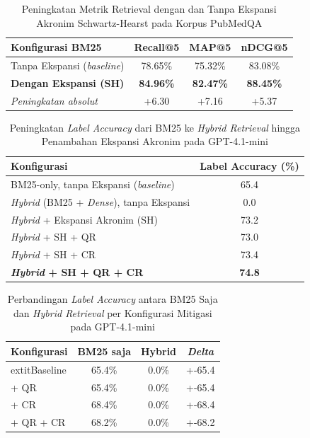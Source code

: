 \begin{table}[H]
\centering
\caption{Peningkatan Metrik Retrieval dengan dan Tanpa Ekspansi Akronim Schwartz-Hearst pada Korpus PubMedQA}
\label{tbl:retrieval-metrics}
\begin{tabular}{|l|c|c|c|}
\hline
\textbf{Konfigurasi BM25} & \textbf{Recall@5} & \textbf{MAP@5} & \textbf{nDCG@5} \\ \hline
Tanpa Ekspansi (\textit{baseline}) & 78.65\% & 75.32\% & 83.08\% \\ \hline
\textbf{Dengan Ekspansi (SH)} & \textbf{84.96\%} & \textbf{82.47\%} & \textbf{88.45\%} \\ \hline
\textit{Peningkatan absolut} & +6.30 & +7.16 & +5.37 \\ \hline
\end{tabular}
\end{table}

\begin{table}[H]
\centering
\caption{Peningkatan \textit{Label Accuracy} dari BM25 ke \textit{Hybrid Retrieval} hingga Penambahan Ekspansi Akronim pada GPT-4.1-mini}
\label{tbl:bm25-vs-hybrid-progressive}
\begin{tabular}{|l|c|}
\hline
\textbf{Konfigurasi} & \textbf{Label Accuracy (\%)} \\ \hline
BM25-only, tanpa Ekspansi (\textit{baseline}) & 65.4 \\ \hline
\textit{Hybrid} (BM25 + \textit{Dense}), tanpa Ekspansi & 0.0 \\ \hline
\textit{Hybrid} + Ekspansi Akronim (SH) & 73.2 \\ \hline
\textit{Hybrid} + SH + QR & 73.0 \\ \hline
\textit{Hybrid} + SH + CR & 73.4 \\ \hline
\textbf{\textit{Hybrid} + SH + QR + CR} & \textbf{74.8} \\ \hline
\end{tabular}
\end{table}

\begin{table}[H]
\centering
\caption{Perbandingan \textit{Label Accuracy} antara BM25 Saja dan \textit{Hybrid Retrieval} per Konfigurasi Mitigasi pada GPT-4.1-mini}
\label{tbl:bm25-vs-hybrid}
\begin{tabular}{|l|c|c|c|}
\hline
\textbf{Konfigurasi} & \textbf{BM25 saja} & \textbf{Hybrid} & \textbf{\textit{Delta}} \\ \hline
	extit{Baseline} & 65.4\% & 0.0\% & +-65.4 \\ \hline
+ QR & 65.4\% & 0.0\% & +-65.4 \\ \hline
+ CR & 68.4\% & 0.0\% & +-68.4 \\ \hline
+ QR + CR & 68.2\% & 0.0\% & +-68.2 \\ \hline
\end{tabular}
\end{table}

